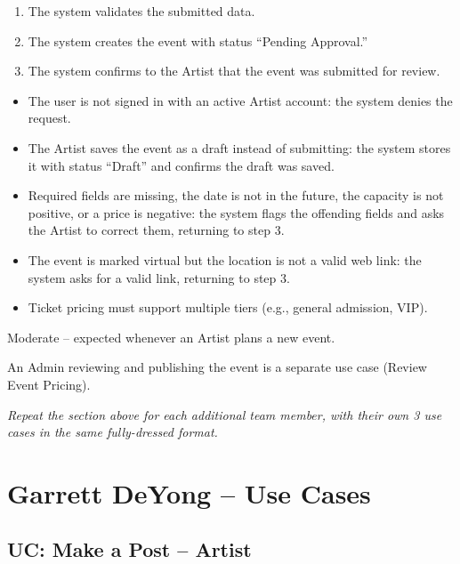 \documentclass[11pt]{report}
\begin{document}
\begin{description}[leftmargin=2.2cm, style=nextline]
\begin{enumerate}
      \item The system validates the submitted data.
      \item The system creates the event with status ``Pending Approval.''
      \item The system confirms to the Artist that the event was submitted for review.
    \end{enumerate}
  \item[Extensions]
    \begin{itemize}
      \item[*a.] The user is not signed in with an active Artist account: the system denies the request.
      \item[4a.] The Artist saves the event as a draft instead of submitting: the system stores it with status ``Draft'' and confirms the draft was saved.
      \item[5a.] Required fields are missing, the date is not in the future, the capacity is not positive, or a price is negative: the system flags the offending fields and asks the Artist to correct them, returning to step 3.
      \item[5b.] The event is marked virtual but the location is not a valid web link: the system asks for a valid link, returning to step 3.
    \end{itemize}
  \item[Special Requirements]
    \begin{itemize}
      \item Ticket pricing must support multiple tiers (e.g., general admission, VIP).
    \end{itemize}
  \item[Frequency of Occurrence] Moderate -- expected whenever an Artist plans a new event.
  \item[Notes] An Admin reviewing and publishing the event is a separate use case (Review Event Pricing).
\end{description}

\bigskip
\textit{Repeat the section above for each additional team member, with their own 3 use cases in the same fully-dressed format.}

\section{Garrett DeYong -- Use Cases}

\subsection{UC: Make a Post -- Artist}
\end{document}
